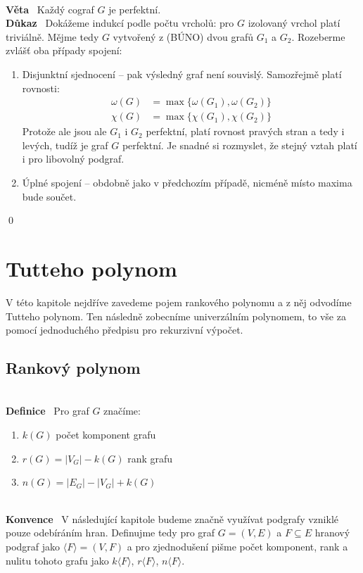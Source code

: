 \documentclass{article}
\renewcommand{\paragraph}[1]{\ \\\smallskip\noindent\textbf{#1}\ }
\begin{document}
\paragraph{Věta} Každý cograf $G$ je perfektní.
\paragraph{Důkaz}
Dokážeme indukcí podle počtu vrcholů: pro $G$ izolovaný vrchol platí triviálně.  
Mějme tedy $G$ vytvořený z (BÚNO) dvou grafů $G_1$ a $G_2$. Rozeberme zvlášť oba 
případy spojení:
\begin{enumerate}
	\item Disjunktní sjednocení -- pak výsledný graf není souvislý. Samozřejmě 
	platí rovnosti: 
	\begin{align}
	\omega(G) &= \max\{\omega(G_1),\omega(G_2)\} \\
	\chi(G) &= \max\{\chi(G_1),\chi(G_2)\}
	\end{align}
	Protože ale jsou ale $G_1$ i $G_2$ perfektní, platí rovnost pravých stran a 
	tedy i levých, tudíž je graf $G$ perfektní. Je snadné si rozmyslet, že 
	stejný vztah platí i pro libovolný podgraf.
	\item Úplné spojení -- obdobně jako v předchozím případě, nicméně místo 
	maxima bude součet.
\end{enumerate}
\qed

\section{Tutteho polynom}
V této kapitole nejdříve zavedeme pojem rankového polynomu a z něj odvodíme 
Tutteho polynom. Ten následně zobecníme univerzálním polynomem, to vše za pomocí 
jednoduchého předpisu pro rekurzivní výpočet.
\subsection{Rankový polynom}
\paragraph{Definice}
Pro graf $G$ značíme:
\begin{enumerate}
	\item $k(G)$ počet komponent grafu
	\item $r(G) = |V_G| - k(G)$ rank grafu
	\item $n(G) = |E_G| - |V_G| + k(G)$
\end{enumerate}
\paragraph{Konvence} V následující kapitole budeme značně využívat podgrafy 
vzniklé pouze odebíráním hran. Definujme tedy pro graf $G=(V,E)$ a $F\subseteq 
E$ hranový podgraf jako $\langle F \rangle = (V, F)$ a pro zjednodušení pišme 
počet komponent, rank a nulitu tohoto grafu jako $k\langle F\rangle$, $r\langle 
F\rangle$, $n\langle F\rangle$.
\end{document}

